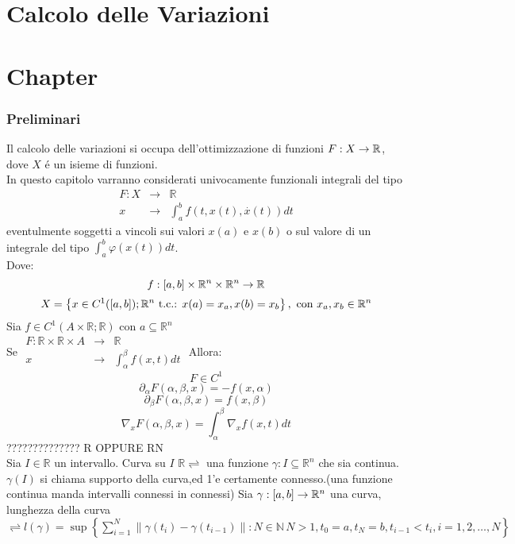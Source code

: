 \part{Calcolo delle Variazioni}
\part{Chapter}

\section{Preliminari}
Il calcolo delle variazioni si occupa dell'ottimizzazione di funzioni $F:X\to\mathbb{R}$, dove $X$ \'e un isieme di funzioni.\\
In questo capitolo varranno considerati univocamente funzionali integrali del tipo
$$\begin{array}{rcl} F: X & \to & \mathbb{R} \\
x & \to & \int_{a}^b f(t,x(t),\overset{\cdot}{x}(t))dt\end{array}$$
eventulmente soggetti a vincoli sui valori $x(a)$ e $x(b)$ o sul valore di un integrale del tipo $\int_a^b \varphi(x(t))dt$.\\
Dove:
$$f:\left[a,b\right]\times\mathbb{R}^n\times\mathbb{R}^n\to\mathbb{R}$$
$$X=\left\{x\in C^1(\left[a,b\right]);\mathbb{R}^n\text{ t.c.: }x(a)=x_a, x(b)=x_b \right\},\text{ con }x_a,x_b\in\mathbb{R}^n$$
\proposition
Sia $f\in C^1(A\times\mathbb{R};\mathbb{R})$ con $a\subseteq\mathbb{R}^n$\\
Se $\begin{array}{ccc} F: \mathbb{R}\times\mathbb{R}\times A & \to & \mathbb{R} \\
x & \to & \int_{\alpha}^\beta f(x,t)dt\end{array}$
Allora:
$$ F\in C^1$$
$$ \partial_\alpha F(\alpha,\beta,x)=-f(x,\alpha)$$
$$ \partial_\beta F(\alpha,\beta,x)=f(x,\beta)$$
$$ \nabla_x F(\alpha,\beta,x)=\int_{\alpha}^{\beta}\nabla_xf(x,t)dt$$
 ?????????????? R OPPURE RN\\
Sia $I\in\mathbb{R}$ un intervallo. Curva su $I$ $\mathbb{R}\rightleftharpoons$ una funzione $\gamma:I\subseteq\mathbb{R}^n$ che sia continua.
\observation
$\gamma(I)$ si chiama supporto della curva,ed 1'e certamente connesso.(una funzione continua manda intervalli connessi in connessi)
Sia $\gamma:\left[a,b\right]\to\mathbb{R}^n$ una curva, lunghezza della curva $\rightleftharpoons l(\gamma)=\sup\left\{\sum\limits_{i=1}^{N}\left\|\gamma(t_i)-\gamma(t_{i-1})\right\|: N\in\mathbb{N}\,N>1,t_0=a,t_N=b,t_{i-1}<t_i, i=1,2,\ldots,N \right\}$ 

